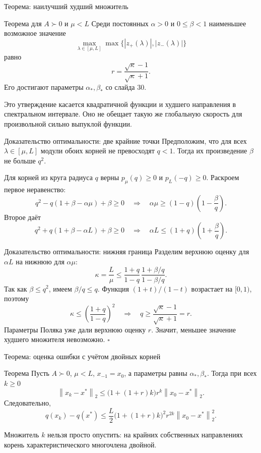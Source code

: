 \documentclass[aspectratio=169,10pt]{beamer}
\newcommand{\norm}[1]{\left\lVert #1\right\rVert}
\begin{document}
\begin{frame}{Теорема: наилучший худший множитель}
\small
\begin{block}{Теорема для $A\succ0$ и $\mu<L$}
Среди постоянных $\alpha>0$ и $0\le\beta<1$ наименьшее возможное значение
\[
\max_{\lambda\in[\mu,L]}\max\{|z_+(\lambda)|,|z_-(\lambda)|\}
\]
равно
\[
\boxed{r=\frac{\sqrt\kappa-1}{\sqrt\kappa+1}}.
\]
Его достигают параметры $\alpha_*,\beta_*$ со слайда 30.
\end{block}
Это утверждение касается квадратичной функции и худшего направления в спектральном интервале. Оно не обещает такую же глобальную скорость для произвольной сильно выпуклой функции.
\end{frame}

\begin{frame}{Доказательство оптимальности: две крайние точки}
\small
Предположим, что для всех $\lambda\in[\mu,L]$ модули обоих корней не превосходят $q<1$. Тогда их произведение $\beta$ не больше $q^2$.

Для корней из круга радиуса $q$ верны $p_\mu(q)\ge0$ и $p_L(-q)\ge0$. Раскроем первое неравенство:
\[
q^2-q(1+\beta-\alpha\mu)+\beta\ge0
\quad\Longrightarrow\quad
\alpha\mu\ge(1-q)\left(1-\frac{\beta}{q}\right).
\]
Второе даёт
\[
q^2+q(1+\beta-\alpha L)+\beta\ge0
\quad\Longrightarrow\quad
\alpha L\le(1+q)\left(1+\frac{\beta}{q}\right).
\]
\end{frame}

\begin{frame}{Доказательство оптимальности: нижняя граница}
\small
Разделим верхнюю оценку для $\alpha L$ на нижнюю для $\alpha\mu$:
\[
\kappa=\frac L\mu
\le\frac{1+q}{1-q}\,
   \frac{1+\beta/q}{1-\beta/q}.
\]
Так как $\beta\le q^2$, имеем $\beta/q\le q$. Функция $(1+t)/(1-t)$ возрастает на $[0,1)$, поэтому
\[
\kappa\le\left(\frac{1+q}{1-q}\right)^2
\quad\Longrightarrow\quad
q\ge\frac{\sqrt\kappa-1}{\sqrt\kappa+1}=r.
\]
Параметры Поляка уже дали верхнюю оценку $r$. Значит, меньшее значение худшего множителя невозможно. \hfill$\square$
\end{frame}

\begin{frame}{Теорема: оценка ошибки с учётом двойных корней}
\small
\begin{block}{Теорема}
Пусть $A\succ0$, $\mu<L$, $x_{-1}=x_0$, а параметры равны $\alpha_*,\beta_*$. Тогда при всех $k\ge0$
\[
\boxed{\norm{x_k-x^*}_2
\le \bigl(1+(1+r)k\bigr)r^k\norm{x_0-x^*}_2.}
\]
Следовательно,
\[
q(x_k)-q(x^*)\le
\frac L2\bigl(1+(1+r)k\bigr)^2r^{2k}\norm{x_0-x^*}_2^2.
\]
\end{block}
Множитель $k$ нельзя просто опустить: на крайних собственных направлениях корень характеристического многочлена двойной.
\end{frame}
\end{document}
